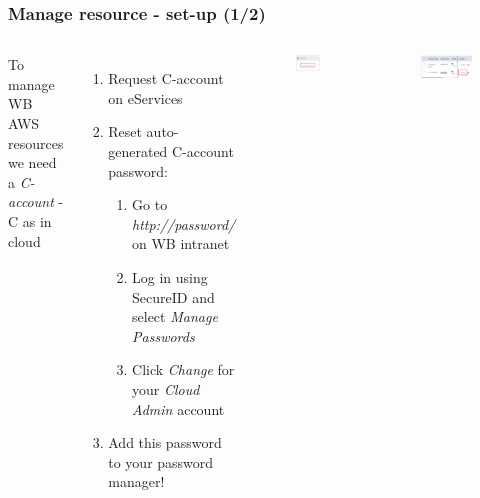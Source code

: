 \documentclass[aspectratio=169]{beamer} %
\begin{document}
\begin{frame}
	\frametitle{Manage resource - set-up (1/2)}
	\begin{columns}[c]


		To manage WB AWS resources we need a \textit{C-account} - C as in cloud

		\begin{enumerate}
			\item Request C-account on eServices
			\item Reset auto-generated C-account password:
			\begin{enumerate}
				\item Go to \textit{http://password/} on WB intranet
				\item Log in using SecureID and select \textit{Manage Passwords}
				\item Click \textit{Change} for your \textit{Cloud Admin} account
			\end{enumerate}
			\item Add this password to your password manager!
		\end{enumerate}

		\begin{figure}
			\centering
			\includegraphics[width=.5\textwidth]{./img/password-1.png}
		\end{figure}
		\vspace{.2cm}
		\begin{figure}
			\centering
			\includegraphics[width=1\textwidth]{./img/password-2.png}
		\end{figure}

	\end{columns}
\end{frame}
\end{document}
